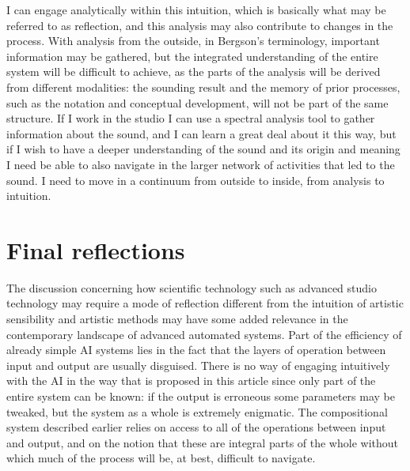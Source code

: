 \documentclass[11pt]{article}
\begin{document}
I can engage analytically within this intuition, which is basically what may be referred to as reflection, and this analysis may also contribute to changes in the process.
With analysis from the outside, in Bergson's terminology, important information may be gathered, but the integrated understanding of the entire system will be difficult to achieve, as the parts of the analysis will be derived from different modalities: the sounding result and the memory of prior processes, such as the notation and conceptual development, will not be part of the same structure.
If I work in the studio I can use a spectral analysis tool to gather information about the sound, and I can learn a great deal about it this way, but if I wish to have a deeper understanding of the sound and its origin and meaning I need be able to also navigate in the larger network of activities that led to the sound.
I need to move in a continuum from outside to inside, from analysis to intuition.
\section*{Final reflections}
\label{sec:orga234fcf}
The discussion concerning how scientific technology such as advanced studio technology may require a mode of reflection different from the intuition of artistic sensibility  and artistic methods may have some added relevance in the contemporary landscape of advanced automated systems.
Part of the efficiency of already simple AI systems lies in the fact that the layers of operation between input and output are usually disguised.
There is no way of engaging intuitively with the AI in the way that is proposed in this article since only part of the entire system can be known: if the output is erroneous some parameters may be tweaked, but the system as a whole is extremely enigmatic.
The compositional system described earlier relies on access to all of the operations between input and output, and on the notion that these are integral parts of the whole without which much of the process will be, at best, difficult to navigate.
\end{document}
